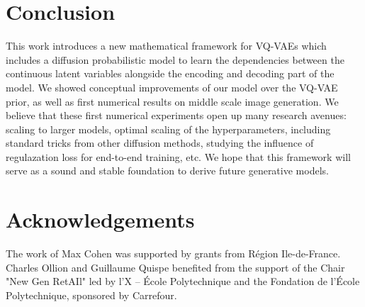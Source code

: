 \documentclass{article}
\theoremstyle{plain}
\theoremstyle{definition}
\theoremstyle{remark}
\begin{document}
\section{Conclusion}
This work introduces a new mathematical framework for VQ-VAEs which includes a diffusion probabilistic model to learn the dependencies between the continuous latent  variables alongside the encoding and decoding part of the model. We showed conceptual improvements of our model over the VQ-VAE prior, as well as first numerical results on middle scale image generation. We believe that these first numerical experiments open up many research avenues: scaling to larger models, optimal scaling of the hyperparameters, including standard tricks from other diffusion methods, studying the influence of regulazation loss for end-to-end training, etc. We hope that this framework will serve as a sound and stable foundation to derive future generative models.


\section*{Acknowledgements}
The work of Max Cohen was supported by grants from R\'egion Ile-de-France. Charles Ollion and Guillaume Quispe benefited from the support of the Chair "New Gen RetAIl" led by l’X – \'Ecole Polytechnique and the Fondation de l’\'Ecole Polytechnique, sponsored by Carrefour.

\end{document}

